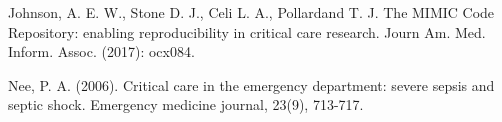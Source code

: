 \documentclass{amia}
\begin{document}
\begin{thebibliography}{1}
        Johnson, A. E. W., Stone D. J., Celi L. A., Pollardand T. J. 
        The MIMIC Code Repository: enabling reproducibility in critical care research.
        Journ Am. Med. Inform. Assoc. (2017): ocx084.

         Nee, P. A. (2006). 
         Critical care in the emergency department: severe sepsis and septic shock. 
         Emergency medicine journal, 23(9), 713-717.
\end{thebibliography}
\end{document}
